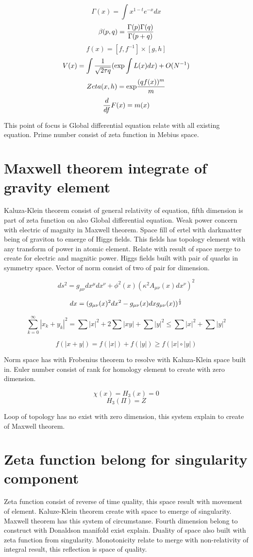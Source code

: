 \documentclass{jsarticle}
\begin{document}
$$ \Gamma(x) = \int x^{1-t}e^{-x}dx $$
$$ \beta(p,q) = {\Gamma(p)\Gamma(q) \over \Gamma(p + q)} $$
$$ f(x) = [f, f^{-1}] \times [g, h] $$
$$ V(x) = \int {1 \over \sqrt{2\tau q}} (\mathrm{exp} \int L(x)dx) + O(N^{-1}) $$
$$ Zeta(x,h) = \mathrm{exp}{(qf(x))^m \over m} $$
$$ {d \over df}F(x) = m(x) $$

  This point of focus is Global differential equation relate with all existing equation.
Prime number consist of zeta function in Mebius space.

\section{Maxwell theorem integrate of gravity element}

  Kaluza-Klein theorem consist of general relativity of equation, fifth dimension is part of zeta function
on also Global differential equation. Weak power concern with electric of magnity in Maxwell theorem. Space
fill of ertel with darkmatter being of graviton to emerge of Higgs fields. This fields has topology element
with any transform of power in atomic element. Relate with result of space merge to create for electric and 
magnitic power. Higgs fields built with pair of quarks in symmetry space.
Vector of norm consist of two of pair for dimension.

$$ ds^2 = g_{\mu\nu}dx^{\mu}dx^{\nu} + \phi^2(x)(\kappa^2 A_{\mu\nu}(x)dx^{\nu})^2 $$

$$ dx = (g_{\mu\nu}(x)^2dx^2 - g_{\mu\nu}(x)dxg_{\mu\nu}(x))^{1 \over 2} $$

$$ \sum^{\infty}_{k=0} |x_{k} + y_{k}|^2 = \sum |x|^2 + 2\sum|xy| + \sum|y|^2 \le \sum|x|^2 + \sum|y|^2 $$

$$ f(|x + y|) = f(|x|) + f(|y|) \ge f(|x| \circ |y|) $$

  Norm space has with Frobenius theorem to resolve with Kaluza-Klein space built in. Euler number consist of rank
for homology element to create with zero dimension.

$$ \chi(x) = H_{3}(x) = 0 $$
$$ H_{3}(\Pi) = Z $$

  Loop of topology has no exist with zero dimension, this system explain to create of Maxwell theorem.

  \section{Zeta function belong for singularity component}

  Zeta function consist of reverse of time quality, this space result with movement of element. Kaluze-Klein theorem
create with space to emerge of singularity. Maxwell theorem has this system of circumstanse. Fourth dimension belong
to construct with Donaldson manifold exist explain. Duality of space also built with zeta function from singularity.
Monotonicity relate to merge with non-relativity of integral result, this reflection is space of quality.
\end{document}

